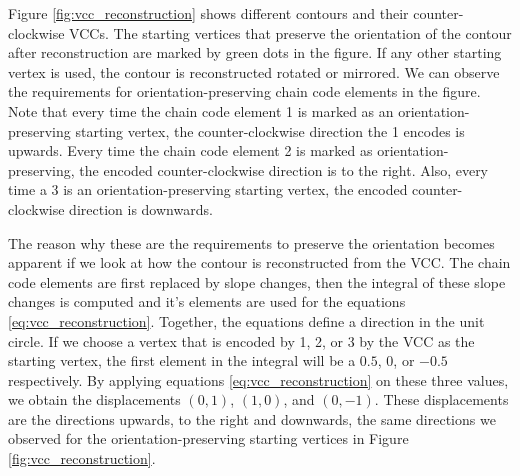 \documentclass[thesis.tex]{subfiles}
\begin{document}
Figure \ref{fig:vcc_reconstruction} shows different contours and their counter-clockwise VCCs. The starting vertices that preserve the orientation of the contour after reconstruction are marked by green dots in the figure. If any other starting vertex is used, the contour is reconstructed rotated or mirrored. We can observe the requirements for orientation-preserving chain code elements in the figure. Note that every time the chain code element 1 is marked as an orientation-preserving starting vertex, the counter-clockwise direction the 1 encodes is upwards. Every time the chain code element 2 is marked as orientation-preserving, the encoded counter-clockwise direction is to the right. Also, every time a 3 is an orientation-preserving starting vertex, the encoded counter-clockwise direction is downwards. 

The reason why these are the requirements to preserve the orientation becomes apparent if we look at how the contour is reconstructed from the VCC. The chain code elements are first replaced by slope changes, then the integral of these slope changes is computed and it's elements are used for the equations \ref{eq:vcc_reconstruction}. Together, the equations define a direction in the unit circle. If we choose a vertex that is encoded by 1, 2, or 3 by the VCC as the starting vertex, the first element in the integral will be a $0.5$, $0$, or $-0.5$ respectively. By applying equations \ref{eq:vcc_reconstruction} on these three values, we obtain the displacements $(0, 1)$, $(1, 0)$, and $(0, -1)$. These displacements are the directions upwards, to the right and downwards, the same directions we observed for the orientation-preserving starting vertices in Figure \ref{fig:vcc_reconstruction}.
\end{document}
